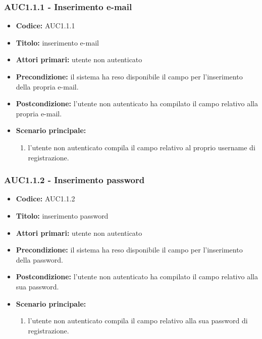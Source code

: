 \documentclass[casi-duso]{subfiles}
\begin{document}
\subsubsection{AUC1.1.1 - Inserimento e-mail}%
\label{subsub:AUC1.1.1}
\begin{itemize}
  \item \textbf{Codice:} AUC1.1.1
  \item \textbf{Titolo:} inserimento e-mail
  \item \textbf{Attori primari:} utente non autenticato
  \item \textbf{Precondizione:} il sistema ha reso disponibile il campo per l'inserimento della propria e-mail.
  \item \textbf{Postcondizione:} l'utente non autenticato ha compilato il campo relativo alla propria e-mail.
  \item \textbf{Scenario principale:} 
  \begin{enumerate}
    \item l'utente non autenticato compila il campo relativo al proprio username di registrazione.
  \end{enumerate}
\end{itemize}

\subsubsection{AUC1.1.2 - Inserimento password}%
\label{subsub:AUC1.1.2}
\begin{itemize}
  \item \textbf{Codice:} AUC1.1.2
  \item \textbf{Titolo:} inserimento password
  \item \textbf{Attori primari:} utente non autenticato
  \item \textbf{Precondizione:} il sistema ha reso disponibile il campo per l'inserimento della password.
  \item \textbf{Postcondizione:} l'utente non autenticato ha compilato il campo relativo alla sua password.
  \item \textbf{Scenario principale:}
  \begin{enumerate}
    \item l'utente non autenticato compila il campo relativo alla sua password di registrazione.
  \end{enumerate}
\end{itemize}
\end{document}
